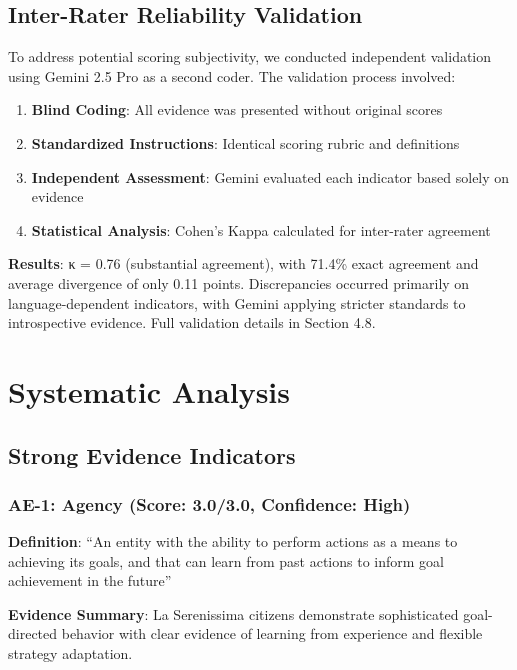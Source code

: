 \documentclass[12pt,a4paper]{article}
\begin{document}
\subsection{Inter-Rater Reliability Validation}

To address potential scoring subjectivity, we conducted independent validation using Gemini 2.5 Pro as a second coder. The validation process involved:

\begin{enumerate}
    \item \textbf{Blind Coding}: All evidence was presented without original scores
    \item \textbf{Standardized Instructions}: Identical scoring rubric and definitions  
    \item \textbf{Independent Assessment}: Gemini evaluated each indicator based solely on evidence
    \item \textbf{Statistical Analysis}: Cohen's Kappa calculated for inter-rater agreement
\end{enumerate}

\textbf{Results}: κ = 0.76 (substantial agreement), with 71.4\% exact agreement and average divergence of only 0.11 points. Discrepancies occurred primarily on language-dependent indicators, with Gemini applying stricter standards to introspective evidence. Full validation details in Section 4.8.

\section{Systematic Analysis}

\subsection{Strong Evidence Indicators}

\subsubsection{AE-1: Agency (Score: 3.0/3.0, Confidence: High)}

\textbf{Definition}: ``An entity with the ability to perform actions as a means to achieving its goals, and that can learn from past actions to inform goal achievement in the future''

\textbf{Evidence Summary}: La Serenissima citizens demonstrate sophisticated goal-directed behavior with clear evidence of learning from experience and flexible strategy adaptation.
\end{document}
